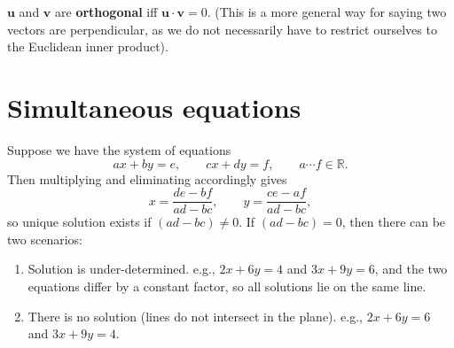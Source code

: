 \documentclass[letter-paper]{tufte-book}
\newcommand{\ub}{\boldsymbol{u}}
\newcommand{\vb}{\boldsymbol{v}}
\newcommand\Def[1]{\textbf{#1}}
\begin{document}
$\ub$ and $\vb$ are \Def{orthogonal} iff $\ub\cdot\vb=0$. (This is a more
general way for saying two vectors are perpendicular, as we do not necessarily
have to restrict ourselves to the Euclidean inner product).


\section{Simultaneous equations}

Suppose we have the system of equations
\begin{equation*}
	ax+by=e,\qquad cx+dy=f,\qquad a\cdots f\in\mathbb{R}.
\end{equation*}
Then multiplying and eliminating accordingly gives
\begin{equation*}
	x=\frac{de-bf}{ad-bc},\qquad y=\frac{ce-af}{ad-bc},
\end{equation*}
so unique solution exists if $(ad-bc)\neq0$. If $(ad-bc)=0$, then there can be
two scenarios:
\begin{enumerate}
	\item Solution is under-determined. e.g., $2x+6y=4$ and $3x+9y=6$, and the
	two equations differ by a constant factor, so all solutions lie on the same
	line.
	\item There is no solution (lines do not intersect in the plane). e.g.,
	$2x+6y=6$ and $3x+9y=4$.
\end{enumerate}
\end{document}
